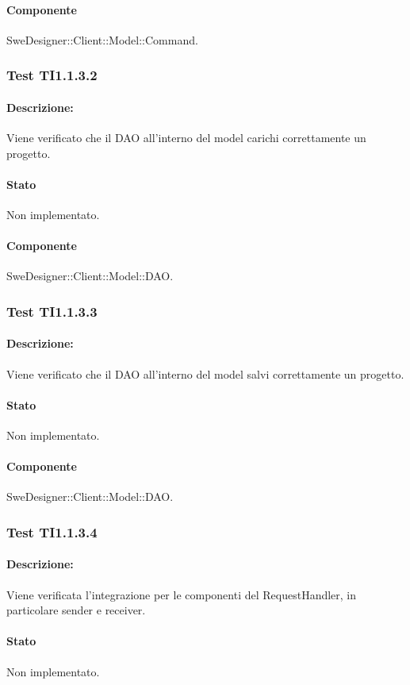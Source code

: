 \documentclass[../PianoDiQualifica.tex]{subfiles}
\begin{document}
	\paragraph{Componente} SweDesigner::Client::Model::Command.
	
	\subsubsection{Test TI1.1.3.2}
	\paragraph{Descrizione:} Viene verificato che il DAO all'interno del model carichi correttamente un progetto.
	\paragraph{Stato} Non implementato.
	\paragraph{Componente} SweDesigner::Client::Model::DAO.
	
	\subsubsection{Test TI1.1.3.3}
	\paragraph{Descrizione:} Viene verificato che il DAO all'interno del model salvi correttamente un progetto.
	\paragraph{Stato} Non implementato.
	\paragraph{Componente} SweDesigner::Client::Model::DAO.
	\subsubsection{Test TI1.1.3.4}
	\paragraph{Descrizione:} Viene verificata l'integrazione per le componenti del RequestHandler, in particolare sender e receiver.
	\paragraph{Stato} Non implementato.
\end{document}

